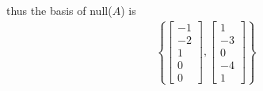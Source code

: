 thus the basis of null($A$) is \begin{align*}
\left\{
\begin{bmatrix}
-1 \\ -2 \\ 1 \\ 0 \\ 0
\end{bmatrix}, \begin{bmatrix}
1 \\ -3 \\ 0 \\ -4 \\ 1
\end{bmatrix}
\right\}
\end{align*}



